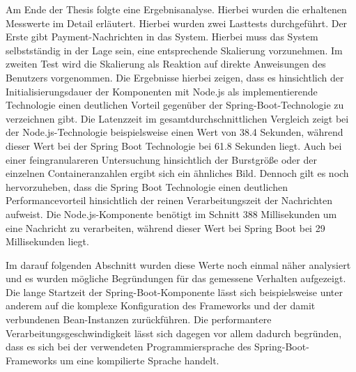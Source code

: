 Am Ende der Thesis folgte eine Ergebnisanalyse. Hierbei wurden die erhaltenen Messwerte im Detail erläutert. Hierbei wurden zwei Lasttests durchgeführt. Der Erste gibt Payment-Nachrichten in das System. Hierbei muss das System selbstständig in der Lage sein, eine entsprechende Skalierung vorzunehmen. Im zweiten Test wird die Skalierung als Reaktion auf direkte Anweisungen des Benutzers vorgenommen. Die Ergebnisse hierbei zeigen, dass es hinsichtlich der Initialisierungsdauer der Komponenten mit Node.js als implementierende Technologie einen deutlichen Vorteil gegenüber der Spring-Boot-Technologie zu verzeichnen gibt. Die Latenzzeit im gesamtdurchschnittlichen Vergleich zeigt bei der Node.js-Technologie beispielsweise einen Wert von 38.4 Sekunden, während dieser Wert bei der Spring Boot Technologie bei 61.8 Sekunden liegt. Auch bei einer feingranulareren Untersuchung hinsichtlich der Burstgröße oder der einzelnen Containeranzahlen ergibt sich ein ähnliches Bild. Dennoch gilt es noch hervorzuheben, dass die Spring Boot Technologie einen deutlichen Performancevorteil hinsichtlich der reinen Verarbeitungszeit der Nachrichten aufweist. Die Node.js-Komponente benötigt im Schnitt 388 Millisekunden um eine Nachricht zu verarbeiten, während dieser Wert bei Spring Boot bei 29 Millisekunden liegt. 

Im darauf folgenden Abschnitt wurden diese Werte noch einmal näher analysiert und es wurden mögliche Begründungen für das gemessene Verhalten aufgezeigt. Die lange Startzeit der Spring-Boot-Komponente lässt sich beispielsweise unter anderem auf die komplexe Konfiguration des Frameworks und der damit verbundenen Bean-Instanzen zurückführen. Die performantere Verarbeitungsgeschwindigkeit lässt sich dagegen vor allem dadurch begründen, dass es sich bei der verwendeten Programmiersprache des Spring-Boot-Frameworks um eine kompilierte Sprache handelt.